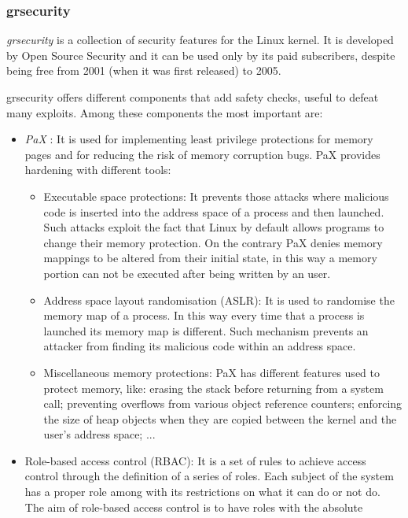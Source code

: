 \documentclass[a4paper,12pt]{article}
\begin{document}
\subsubsection{grsecurity}

\textit{grsecurity} \cite{wiki_grsecurity} is a collection of security features
for the Linux kernel. It is developed by Open Source Security and it can be used
only by its paid subscribers, despite being free from 2001 (when it was first
released) to 2005.\par grsecurity offers different components that add safety
checks, useful to defeat many exploits. Among these components the most
important are:
\begin{itemize}
  \item \textit{PaX} \cite{wiki_PAX}: It is used for implementing least privilege
  protections for memory pages and for reducing the risk of memory corruption
  bugs. PaX provides hardening with different tools: 
  \begin{itemize}
    \item Executable space protections: It prevents those attacks
    where malicious code is inserted into the address space of a process and
    then launched. Such attacks exploit the fact that Linux by default allows
    programs to change their memory protection. On the contrary PaX denies
    memory mappings to be altered from their initial state, in this way a memory
    portion can not be executed after being written by an user. 
    \item Address space layout randomisation (ASLR): It is used to randomise the
    memory map of a process. In this way every time that a process is launched
    its memory map is different. Such mechanism prevents an attacker from
    finding its malicious code within an address space.
    \item Miscellaneous memory protections: PaX has different features used to
    protect memory, like: erasing the stack before returning from a system call;
    preventing overflows from various object reference counters; enforcing  the
    size of heap objects when they are copied between the kernel and the
    user's address space; ... 
  \end{itemize}
  \item Role-based access control (RBAC): It is a set of rules to achieve access
  control through the definition of a series of roles. Each subject of the
  system has a proper role among with its restrictions on what it can do or not
  do. The aim of role-based access control is to have roles with the absolute

\end{itemize}
\end{document}

